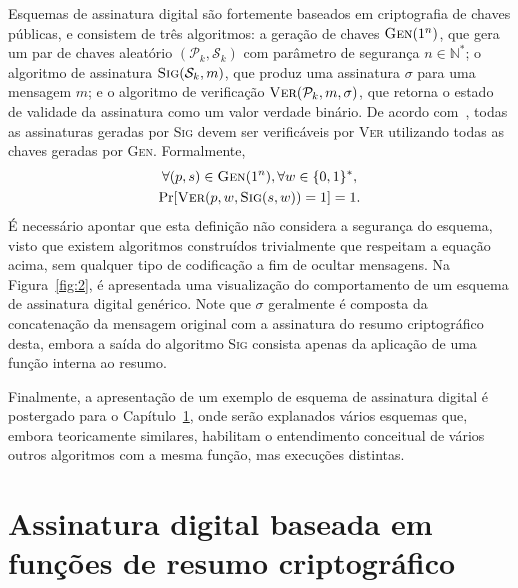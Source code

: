 \documentclass{ufsctex/ufsctex}
\newcommand{\pk}{\mathcal{P}_{k}}
\newcommand{\sk}{\mathcal{S}_{k}}
\newcommand{\binwds}[1]{\{0, 1\}^{#1}}
\begin{document}
Esquemas de assinatura digital são fortemente baseados em criptografia de
chaves públicas, e consistem de três algoritmos: a geração de chaves
$\textsc{Gen}(1^{n})$, que gera um par de chaves aleatório $(\pk{}, \sk{})$ com
parâmetro de segurança $n \in \mathbb{N}^{*}$; o algoritmo de assinatura
$\textsc{Sig}(\sk{}, m)$, que produz uma assinatura $\sigma$ para uma mensagem
$m$; e o algoritmo de verificação $\textsc{Ver}(\pk{}, m, \sigma)$, que retorna
o estado de validade da assinatura como um valor verdade binário. De acordo
com~\cite[Subseção 6.1.3]{Goldreich:book:2004}, todas as assinaturas geradas
por \textsc{Sig} devem ser verificáveis por \textsc{Ver} utilizando todas as
chaves geradas por \textsc{Gen}. Formalmente,
\begin{multline}
  \forall (p, s) \in \textsc{Gen}(1^{n}), \forall w \in \binwds{*}, \\
    \text{Pr}[\textsc{Ver}(p, w, \textsc{Sig}(s, w)) = 1] = 1.
\end{multline}
É necessário apontar que esta definição não considera a segurança do esquema,
visto que existem algoritmos construídos trivialmente que respeitam a equação
acima, sem qualquer tipo de codificação a fim de ocultar mensagens. Na
Figura~\ref{fig:2}, é apresentada uma visualização do comportamento de um
esquema de assinatura digital genérico. Note que $\sigma$ geralmente é composta
da concatenação da mensagem original com a assinatura do resumo criptográfico
desta, embora a saída do algoritmo \textsc{Sig} consista apenas da aplicação de
uma função interna ao resumo.

Finalmente, a apresentação de um exemplo de esquema de assinatura digital é
postergado para o Capítulo~\ref{chapter:hashsig}, onde serão explanados vários
esquemas que, embora teoricamente similares, habilitam o entendimento
conceitual de vários outros algoritmos com a mesma função, mas execuções
distintas.

\chapter{Assinatura digital baseada em
  funções de resumo criptográfico}\label{chapter:hashsig}
\end{document}
